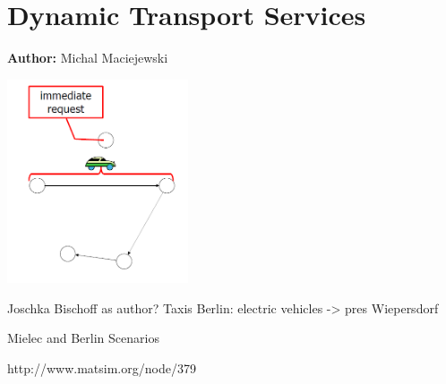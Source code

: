 \chapter{Dynamic Transport Services }
\label{ch:dts}

\hfill \textbf{Author:} Michal Maciejewski

\begin{center} \includegraphics[width=0.4\textwidth, angle=0]{extending/figures/DTS/dts.png} \end{center}

Joschka Bischoff as author?
Taxis Berlin: electric vehicles -> pres Wiepersdorf

Mielec and Berlin Scenarios

http://www.matsim.org/node/379


